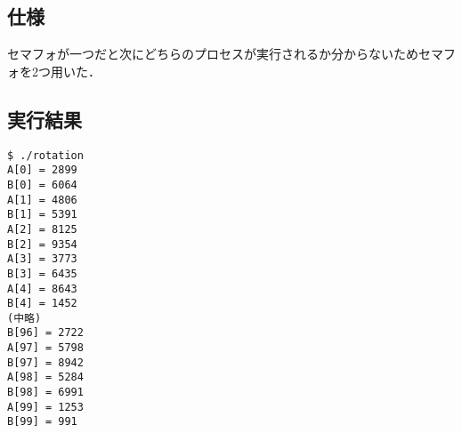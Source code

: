 \documentclass[a4j,10pt,titlepage]{jsarticle}
\begin{document}
\subsection{仕様}
セマフォが一つだと次にどちらのプロセスが実行されるか分からないためセマフォを2つ用いた．
\subsection{実行結果}
\begin{verbatim}
$ ./rotation 
A[0] = 2899
B[0] = 6064
A[1] = 4806
B[1] = 5391
A[2] = 8125
B[2] = 9354
A[3] = 3773
B[3] = 6435
A[4] = 8643
B[4] = 1452
(中略)
B[96] = 2722
A[97] = 5798
B[97] = 8942
A[98] = 5284
B[98] = 6991
A[99] = 1253
B[99] = 991
\end{verbatim}
\end{document}
